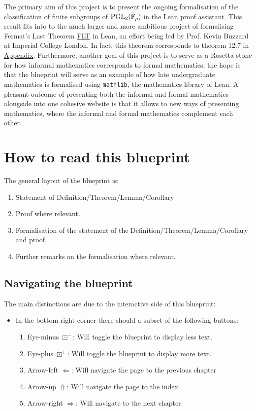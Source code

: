 The primary aim of this project is to present the ongoing formalisation of the classification of finite subgroups of $\operatorname{PGL}_2(\bar{\mathbb{F}}_p)$ in the Lean proof assistant. This result fits into to the much larger and more ambitious project
of formalising Fermat's Last Theorem \href{https://imperialcollegelondon.github.io/FLT/blueprint/}{FLT} in Lean, an effort being led by Prof. Kevin Buzzard at Imperial College London. In fact, this theorem corresponds to theorem 12.7 in \href{https://imperialcollegelondon.github.io/FLT/blueprint/ch_bestiary.html}{Appendix}.
Furthermore, another goal of this project is to serve as a Rosetta stone for how informal mathematics corresponds to formal mathematics; the hope is that the blueprint will serve as an example of how late undergraduate mathematics is formalised using \texttt{mathlib}, the mathematics library of Lean.
A pleasant outcome of presenting both the informal and formal mathematics alongside into one cohesive website is that it allows to new ways of presenting mathematics, where the informal and formal mathematics complement each other.


\section{How to read this blueprint}

The general layout of the blueprint is:

\begin{enumerate}
    \item Statement of Definition/Theorem/Lemma/Corollary
    \item Proof where relevant.
    \item Formalisation of the statement of the Definition/Theorem/Lemma/Corollary
    and proof.
    \item Further remarks on the formalisation where relevant.
\end{enumerate}
\subsection{Navigating the blueprint}

The main distinctions are due to the interactive side of this blueprint:

\begin{itemize}
    \item In the bottom right corner there should a subset of the following buttons: 
        \begin{enumerate}
            \item Eye-minus $\boxdot^-$: Will toggle the blueprint to display less text.
            \item Eye-plus $\boxdot^+$: Will toggle the blueprint to display more text. 
            \item Arrow-left $\Leftarrow$: Will navigate the page to the previous chapter
            \item Arrow-up $\Uparrow$: Will navigate the page to the index.
            \item Arrow-right $\Rightarrow$: Will navigate to the next chapter.
        \end{enumerate}
\end{itemize}

